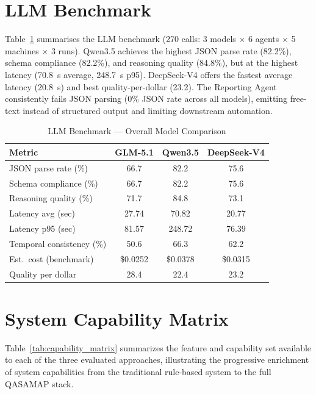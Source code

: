 \section{LLM Benchmark}
\label{sec:llm_benchmark}

Table~\ref{tab:llm_benchmark} summarises the LLM benchmark (270 calls: 3 models $\times$ 6 agents $\times$ 5 machines $\times$ 3 runs). Qwen3.5 achieves the highest JSON parse rate (82.2\%), schema compliance (82.2\%), and reasoning quality (84.8\%), but at the highest latency (70.8~s average, 248.7~s p95). DeepSeek-V4 offers the fastest average latency (20.8~s) and best quality-per-dollar (23.2). The Reporting Agent consistently fails JSON parsing (0\% JSON rate across all models), emitting free-text instead of structured output and limiting downstream automation.

\begin{table}[htbp]
\centering
\caption{LLM Benchmark --- Overall Model Comparison}
\label{tab:llm_benchmark}
\begin{tabular}{lccc}
\hline
\textbf{Metric} & \textbf{GLM-5.1} & \textbf{Qwen3.5} & \textbf{DeepSeek-V4} \\
\hline
JSON parse rate (\%)   & 66.7 & 82.2 & 75.6 \\
Schema compliance (\%) & 66.7 & 82.2 & 75.6 \\
Reasoning quality (\%) & 71.7 & 84.8 & 73.1 \\
Latency avg (sec)      & 27.74 & 70.82 & 20.77 \\
Latency p95 (sec)      & 81.57 & 248.72 & 76.39 \\
Temporal consistency (\%) & 50.6 & 66.3 & 62.2 \\
Est.\ cost (benchmark) & \$0.0252 & \$0.0378 & \$0.0315 \\
Quality per dollar     & 28.4 & 22.4 & 23.2 \\
\hline
\end{tabular}
\end{table}

\section{System Capability Matrix}

Table~\ref{tab:capability_matrix} summarizes the feature and capability set available to each of the three evaluated approaches, illustrating the progressive enrichment of system capabilities from the traditional rule-based system to the full QASAMAP stack.

